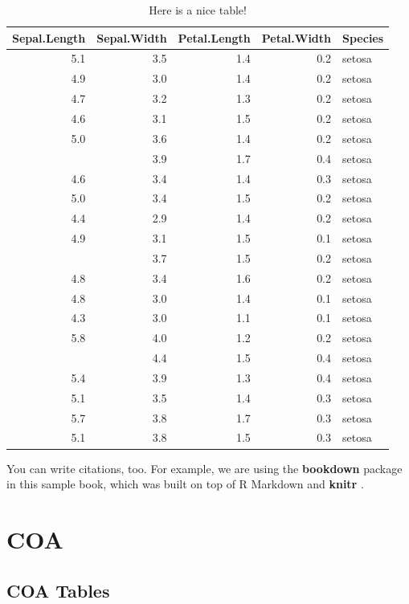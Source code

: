 \documentclass[
]{book}
\begin{document}
\begin{table}

\caption{\label{tab:nice-tab}Here is a nice table!}
\centering
\begin{tabular}[t]{rrrrl}
\toprule
Sepal.Length & Sepal.Width & Petal.Length & Petal.Width & Species\\
\midrule
5.1 & 3.5 & 1.4 & 0.2 & setosa\\
4.9 & 3.0 & 1.4 & 0.2 & setosa\\
4.7 & 3.2 & 1.3 & 0.2 & setosa\\
4.6 & 3.1 & 1.5 & 0.2 & setosa\\
5.0 & 3.6 & 1.4 & 0.2 & setosa\\
\addlinespace
5.4 & 3.9 & 1.7 & 0.4 & setosa\\
4.6 & 3.4 & 1.4 & 0.3 & setosa\\
5.0 & 3.4 & 1.5 & 0.2 & setosa\\
4.4 & 2.9 & 1.4 & 0.2 & setosa\\
4.9 & 3.1 & 1.5 & 0.1 & setosa\\
\addlinespace
5.4 & 3.7 & 1.5 & 0.2 & setosa\\
4.8 & 3.4 & 1.6 & 0.2 & setosa\\
4.8 & 3.0 & 1.4 & 0.1 & setosa\\
4.3 & 3.0 & 1.1 & 0.1 & setosa\\
5.8 & 4.0 & 1.2 & 0.2 & setosa\\
\addlinespace
5.7 & 4.4 & 1.5 & 0.4 & setosa\\
5.4 & 3.9 & 1.3 & 0.4 & setosa\\
5.1 & 3.5 & 1.4 & 0.3 & setosa\\
5.7 & 3.8 & 1.7 & 0.3 & setosa\\
5.1 & 3.8 & 1.5 & 0.3 & setosa\\
\bottomrule
\end{tabular}
\end{table}

You can write citations, too. For example, we are using the \textbf{bookdown} package \citep{R-bookdown} in this sample book, which was built on top of R Markdown and \textbf{knitr} \citep{xie2015}.

\hypertarget{coa}{%
\chapter{COA}\label{coa}}

\hypertarget{coa-tables}{%
\section{COA Tables}\label{coa-tables}}
\end{document}
